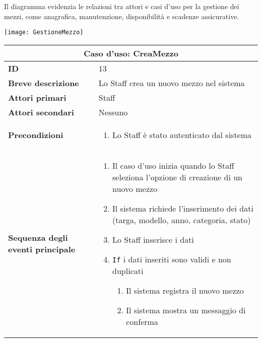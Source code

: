 \documentclass[a4paper]{report}
\begin{document}
\clearpage
{}

Il diagramma evidenzia le relazioni tra attori e casi d’uso per la gestione dei mezzi, come anagrafica, manutenzione, disponibilità e scadenze assicurative.

\begin{figure*}[ht]
    \centering
    \texttt{[image: GestioneMezzo]}
\end{figure*}

\clearpage
\begin{table}[H]
\vspace*{-0cm}
\renewcommand{\arraystretch}{1.9}
\begin{tabular}{|p{3.9cm}|p{9.9cm}|}
\hline
\multicolumn{2}{|c|}{\textbf{Caso d’uso: CreaMezzo}} \\ \hline
	\textbf{ID} & 13 \\ \hline
	\textbf{Breve descrizione} & Lo Staff crea un nuovo mezzo nel sistema \\ \hline
	\textbf{Attori primari} & Staff \\ \hline
	\textbf{Attori secondari} & Nessuno \\ \hline
	\textbf{Precondizioni} & \begin{enumerate}[label=\arabic*.,leftmargin=14pt,labelsep=0.5em,topsep=0pt,partopsep=0pt,parsep=0pt,itemsep=0pt]
        \item Lo Staff è stato autenticato dal sistema
    \end{enumerate} \\ \hline
	\textbf{Sequenza degli eventi principale} &
\begin{enumerate}[leftmargin=14pt,label=\arabic*.,labelsep=0.5em,topsep=0pt,partopsep=0pt,parsep=0pt,itemsep=0pt]
    \item Il caso d’uso inizia quando lo Staff seleziona l'opzione di creazione di un nuovo mezzo
    \item Il sistema richiede l’inserimento dei dati (targa, modello, anno, categoria, stato)
    \item Lo Staff inserisce i dati
    \item \texttt{If} i dati inseriti sono validi e non duplicati
    \begin{enumerate}[label=\arabic{enumi}.\arabic*.,leftmargin=22pt,labelsep=0.5em,topsep=0pt,partopsep=0pt,parsep=0pt,itemsep=0pt]
        \item Il sistema registra il nuovo mezzo
        \item Il sistema mostra un messaggio di conferma

\end{enumerate}
\end{enumerate}
\end{tabular}
\end{table}
\end{document}
